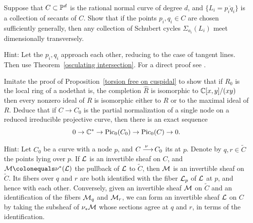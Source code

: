 \begin{exercise}\label{BN via nodal curves}\label{secant general position}
Suppose that $C\subset {\mathbb P}^{d}$ is the rational normal curve of degree
$d$, and $\{L_{i} = \overline{p_{i}q_{i}}\}$
is a collection of secants of $C$. Show that if the points $p_{i},
q_{i}\in C$ are chosen sufficiently generally,
then any collection of Schubert cycles $\Sigma_{a_{i}}(L_{i})$ meet
dimensionally transversely.

Hint: Let the $p_{i}, q_{i}$ approach each other, reducing to the case
of tangent lines. Then use
Theorem~\ref{osculating intersection}. For a direct proof see \cite[Lemma,
p.~259]{Griffiths-Harris-BN}.
\end{exercise}

\begin{exercise}\label{linear series on a nodal curve}
Imitate the proof of Proposition~\ref{torsion free on cuspidal} to
show that if $R_{0}$ is the local ring of a node\emdash that is, the
completion $\widehat R$ is isomorphic to ${\mathbb C}[x,y]/(xy)$\emdash then
every nonzero ideal of $R$ is isomorphic
either to $R$ or to the maximal ideal of $R$. Deduce that if $C\to C_{0}$
is the
partial normalization of a single node on a reduced irreducible projective
curve, then there is an exact sequence
$$0\to {\mathbb C}^{*} \to \operatorname{Pic}_{0}(C_{0}) \to \operatorname{Pic}_{0}(C) \to 0.$$

Hint:
Let $C_{0}$ be a curve with a node $p$, and $C \ruto {\,\nu} C_{0}$
%
its 
at $p$. Denote by $q,r \in \widetilde C$
the points lying over $p$. If ${\mathcal L}$ is an invertible sheaf on $C$, and
$\cM \colonequals  \nu^*(\cL)$ the pullback of ${\mathcal L}$ to $\widetilde C$,
then ${\mathcal M}$ is an invertible sheaf on $\widetilde C$. Its fibers over $q$
and $r$ are both identified with the fiber ${\mathcal L}_p$ of ${\mathcal L}$ at $p$, and
hence with each other. Conversely, given an invertible sheaf ${\mathcal M}$ on
$\widetilde C$ and an identification of the fibers ${\mathcal M}_q$ and ${\mathcal M}_r$,
we can form an invertible sheaf ${\mathcal L}$ on $C$ by taking the subsheaf
of $\nu_*{\mathcal M}$ whose sections agree at $q$ and $r$, in terms of the
identification.
\end{exercise}

